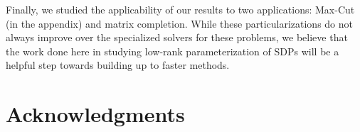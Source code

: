 \documentclass[final, 12pt]{colt2018}
\begin{document}
Finally, we studied the applicability of our results to two applications: Max-Cut (in the appendix) and matrix completion. While these particularizations do not always improve over the specialized solvers for these problems, we believe that the work done here in studying low-rank parameterization of SDPs will be a helpful step towards building up to faster methods.



\section*{Acknowledgments}


%


\appendix





\end{document}
